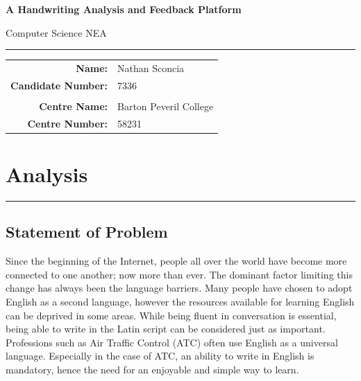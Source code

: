 \documentclass{article}
\begin{document}

\pagestyle{fancy}
\fancyhf{}
\renewcommand{\headrulewidth}{0pt}


\begin{center}\Huge{\textbf{A Handwriting Analysis and Feedback Platform}}\end{center}
\vspace{10pt}
\begin{center}\large{Computer Science NEA}\end{center}

\noindent\rule{\textwidth}{0.2pt}
\vspace{20pt}

\begin{center}
\begin{tabular}{rl}
\textbf{Name:} & Nathan Sconcia \\
\textbf{Candidate Number:} & 7336 \\
\\
\textbf{Centre Name:} & Barton Peveril College \\
\textbf{Centre Number:} & 58231 \\
\end{tabular}
\end{center}

\newpage

\tableofcontents

\newpage

\section{Analysis}
\noindent\rule{\textwidth}{0.2pt}
\subsection{Statement of Problem}
Since the beginning of the Internet, people all over the world have become more connected to one another; now more than ever. The dominant factor limiting this change has always been the language barriers. Many people have chosen to adopt English as a second language, however the resources available for learning English can be deprived in some areas. While being fluent in conversation is essential, being able to write in the Latin script can be considered just as important. Professions such as Air Traffic Control (ATC) often use English as a universal language. Especially in the case of ATC, an ability to write in English is mandatory, hence the need for an enjoyable and simple way to learn.
\end{document}
